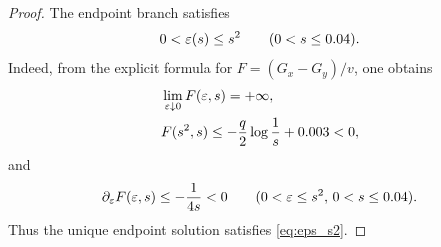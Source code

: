 \begin{proof}
The endpoint branch satisfies
\begin{equation}\label{eq:eps_s2}
  0<\varepsilon(s)\le s^2\qquad(0<s\le0.04).
\end{equation}
Indeed, from the explicit formula for \(F=(G_x-G_y)/v\), one obtains
\begin{align}\label{eq:F_endpoint_bounds}
  &\lim_{\varepsilon\downarrow0}F(\varepsilon,s)=+\infty,\notag\\
  &F(s^2,s)\le -\frac{q}{2}\log\frac1s+0.003<0,
\end{align}
and
\begin{equation}\label{eq:Feps_negative}
  \partial_\varepsilon F(\varepsilon,s)\le -\frac{1}{4s}<0
  \qquad(0<\varepsilon\le s^2,\,0<s\le0.04).
\end{equation}
Thus the unique endpoint solution satisfies \eqref{eq:eps_s2}.


\end{proof}

